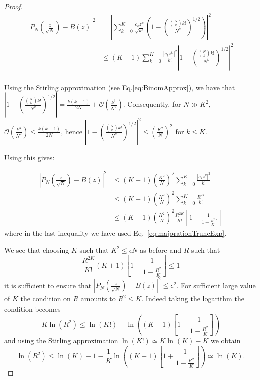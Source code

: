 \documentclass[aps,prl,showpacs,twocolumn]{revtex4-2}
\begin{document}
\begin{proof}
\begin{align*}
   \left|P_N\left(\frac{z}{\sqrt{N}}\right)-B\left(z\right)\right|^2 &=\left| \sum_{k=0}^K \frac{c_kz^k}{\sqrt{k!}}\left(1-\left(\frac{\binom{N}{k}k!}{N^k} \right)^{1/2}\right)\right|^2\\
   &\leq (K+1) \sum_{k=0}^K \frac{|c_kz^k|^2}{{k!}}\left|1-\left(\frac{\binom{N}{k}k!}{N^k} \right)^{1/2}\right|^2\\
\end{align*}

Using the Stirling approximation (see Eq.\eqref{eq:BinomApprox}), we have that $ \left|1-\left(\frac{\binom{N}{k}k!}{N^k} \right)^{1/2}\right|=  \frac{k(k-1)}{2N} + \mathcal{O}(\frac{k^3}{N^2})$. Consequently,  for $N \gg  K^2$,  $\mathcal{O}(\frac{k^3}{N^2})\leq \frac{k(k-1)}{2N}$, hence $\left|1-\left(\frac{\binom{N}{k}k!}{N^k} \right)^{1/2}\right|^2 \leq  (\frac{K^2}{N})^2$ for $k\leq K$.

Using this gives:


\begin{align*}
     \left|P_N\left(\frac{z}{\sqrt{N}}\right)-B\left(z\right)\right|^2 &\leq (K+1) \left(\frac{K^2}{N}\right)^2 \sum_{k=0}^K \frac{|c_kz^k|^2}{{k!}}\\
   &\leq (K+1) \left(\frac{K^2}{N}\right)^2 \sum_{k=0}^K \frac{R^{2k}}{{k!}}\\
   & \leq (K+1) \left(\frac{K^2}{N}\right)^2 \frac{R^{2K}}{K!}
   \left[
   1 + \frac{1}{1-\frac{R^2}{K}}.
   \right]
\end{align*}
where in the last inequality we have used Eq.~\eqref{eq:majorationTruncExp}.


We see that choosing $K$ such that $K^2\leq \epsilon N$ as before and $R$ such that
\[
 \frac{R^{2K}}{K!} (K+1)
\left[
1 + \frac{1}{1-\frac{R^2}{K}}
\right] \leq
1
\]
it is sufficient to ensure that  $ \left|P_N\left(\frac{z}{\sqrt{N}}\right)-B\left(z\right)\right|^2\leq \epsilon^2$.
For sufficient large value of $K$ the condition on $R$ amounts to $R^2\leq K$. Indeed taking the logarithm  the condition becomes
\[
K\ln(R^2) \leq \ln(K!) -\ln\left((K+1)
\left[
1 + \frac{1}{1-\frac{R^2}{K}}
\right]  \right)
\]
and using the Stirling approximation  $\ln(K!)\simeq K\ln(K) - K$ we obtain
\[
\ln(R^2) \leq \ln(K) - 1 -
\frac{1}{K}\ln\left((K+1)
\left[
1 + \frac{1}{1-\frac{R^2}{K}}
\right]  \right)
 \simeq \ln(K).
\]









\end{proof}
\end{document}
